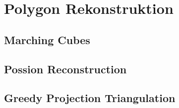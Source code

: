 \section{Polygon Rekonstruktion}

\subsection{Marching Cubes}



\subsection{Possion Reconstruction}

\subsection{Greedy Projection Triangulation}

